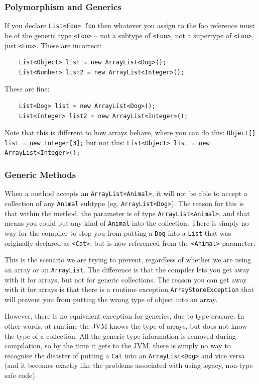 \subsubsection{Polymorphism and Generics}
If you declare \verb#List<Foo> foo# then whatever you assign to the foo 
reference must be of the generic type \verb#<Foo># -- not a subtype of 
\verb#<Foo>#, not a supertype of \verb#<Foo>#, just \verb#<Foo>#. These are 
incorrect:
\begin{verbatim}
    List<Object> list = new ArrayList<Dog>();
    List<Number> list2 = new ArrayList<Integer>();
\end{verbatim}
These are fine:
\begin{verbatim}
    List<Dog> list = new ArrayList<Dog>();
    List<Integer> list2 = new ArrayList<Integer>();
\end{verbatim}
Note that this is different to how arrays behave, where you can do this: 
\verb#Object[] list = new Integer[3];# but not this:
\verb#List<Object> list = new ArrayList<Integer>();#

\subsubsection{Generic Methods}
When a method accepts an \verb#ArrayList<Animal>#, it will not be able to 
accept a collection of any \verb#Animal# subtype (eg. \verb#ArrayList<Dog>#).  
The reason for this is that within the method, the parameter is of type 
\verb#ArrayList<Animal>#, and that means you could put any kind of 
\verb#Animal# into the collection. There is simply no way for the compiler to 
stop you from putting a \verb#Dog# into a \verb#List# that was originally 
declared as \verb#<Cat>#, but is now referenced from the \verb#<Animal># 
parameter.

This is the scenario we are trying to prevent, regardless of whether we are 
using an array or an \verb#ArrayList#. The difference is that the compiler lets 
you get away with it for arrays, but not for generic collections. The reason 
you can get away with it for arrays is that there is a runtime exception 
\verb#ArrayStoreException# that will prevent you from putting the wrong type of 
object into an array.

However, there is no equivalent exception for generics, due to type erasure. In 
other words, at runtime the JVM knows the type of arrays, but does not know the 
type of a collection. All the generic type information is removed during 
compilation, so by the time it gets to the JVM, there is simply no way to 
recognise the disaster of putting a \verb#Cat# into an \verb#ArrayList<Dog># 
and vice versa (and it becomes exactly like the problems associated with using 
legacy, non-type safe code).

